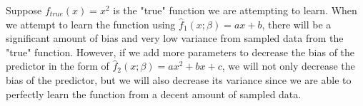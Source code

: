 \tffalse

Suppose $f_{true}(x) = x^2$ is the "true" function we are attempting to learn. When we attempt to learn the function using $\hat{f}_1(x;\beta) = a x + b$, there will be a significant amount of bias and very low variance from sampled data from the "true" function. However, if we add more parameters to decrease the bias of the predictor in the form of $\hat{f}_2(x; \beta) = a x^2 + b x + c$, we will not only decrease the bias of the predictor, but we will also decrease its variance since we are able to perfectly learn the function from a decent amount of sampled data. 